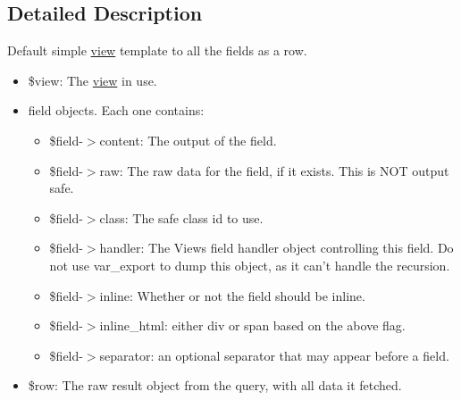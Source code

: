 \subsection{Detailed Description}
Default simple \hyperlink{classview}{view} template to all the fields as a row.

\begin{itemize}
\item \$view: The \hyperlink{classview}{view} in use.\item {}
field objects. Each one contains:\begin{itemize}
\item \$field-$>$content: The output of the field.\item \$field-$>$raw: The raw data for the field, if it exists. This is NOT output safe.\item \$field-$>$class: The safe class id to use.\item \$field-$>$handler: The Views field handler object controlling this field. Do not use var\_\-export to dump this object, as it can't handle the recursion.\item \$field-$>$inline: Whether or not the field should be inline.\item \$field-$>$inline\_\-html: either div or span based on the above flag.\item \$field-$>$separator: an optional separator that may appear before a field.\end{itemize}
\item \$row: The raw result object from the query, with all data it fetched. \end{itemize}
